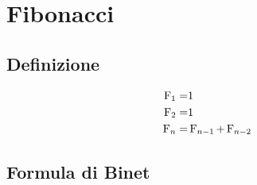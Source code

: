 \chapter{Fibonacci}
\section{Definizione}
\begin{defn}
	\begin{align*}
		\operatorname{F}_{1}=&1\\
		\operatorname{F}_{2}=&1\\
		\operatorname{F}_{n}=&\operatorname{F}_{n-1}+\operatorname{F}_{n-2}
	\end{align*}
\end{defn}
\section{Formula di Binet}